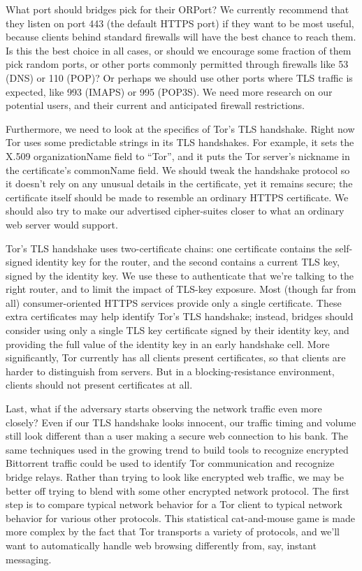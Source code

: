 \documentclass{llncs}
\begin{document}
What port should bridges pick for their ORPort? We currently recommend
that they listen on port 443 (the default HTTPS port) if they want to
be most useful, because clients behind standard firewalls will have
the best chance to reach them. Is this the best choice in all cases,
or should we encourage some fraction of them pick random ports, or other
ports commonly permitted through firewalls like 53 (DNS) or 110
(POP)?  Or perhaps we should use other ports where TLS traffic is
expected, like 993 (IMAPS) or 995 (POP3S).  We need more research on our
potential users, and their current and anticipated firewall restrictions.

Furthermore, we need to look at the specifics of Tor's TLS handshake.
Right now Tor uses some predictable strings in its TLS handshakes. For
example, it sets the X.509 organizationName field to ``Tor'', and it puts
the Tor server's nickname in the certificate's commonName field. We
should tweak the handshake protocol so it doesn't rely on any unusual details
in the certificate, yet it remains secure; the certificate itself
should be made to resemble an ordinary HTTPS certificate.  We should also try
to make our advertised cipher-suites closer to what an ordinary web server
would support.

Tor's TLS handshake uses two-certificate chains: one certificate
contains the self-signed identity key for
the router, and the second contains a current TLS key, signed by the
identity key. We use these to authenticate that we're talking to the right
router, and to limit the impact of TLS-key exposure.  Most (though far from
all) consumer-oriented HTTPS services provide only a single certificate.
These extra certificates may help identify Tor's TLS handshake; instead,
bridges should consider using only a single TLS key certificate signed by
their identity key, and providing the full value of the identity key in an
early handshake cell.  More significantly, Tor currently has all clients
present certificates, so that clients are harder to distinguish from servers.
But in a blocking-resistance environment, clients should not present
certificates at all.

Last, what if the adversary starts observing the network traffic even
more closely? Even if our TLS handshake looks innocent, our traffic timing
and volume still look different than a user making a secure web connection
to his bank. The same techniques used in the growing trend to build tools
to recognize encrypted Bittorrent traffic
could be used to identify Tor communication and recognize bridge
relays. Rather than trying to look like encrypted web traffic, we may be
better off trying to blend with some other encrypted network protocol. The
first step is to compare typical network behavior for a Tor client to
typical network behavior for various other protocols. This statistical
cat-and-mouse game is made more complex by the fact that Tor transports a
variety of protocols, and we'll want to automatically handle web browsing
differently from, say, instant messaging.
\end{document}
